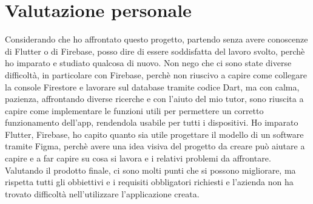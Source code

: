 \newpage

\section{Valutazione personale}
Considerando che ho affrontato questo progetto, partendo senza avere conoscenze di Flutter o di Firebase, posso dire di essere soddisfatta del lavoro svolto, perchè ho imparato e studiato qualcosa di nuovo.\newline
\newline
Non nego che ci sono state diverse difficoltà, in particolare con Firebase, perchè non riuscivo a capire come collegare la console Firestore e lavorare sul database tramite codice Dart, ma con calma, pazienza, affrontando diverse ricerche e con l'aiuto del mio tutor, sono riuscita a capire come implementare le funzioni utili per permettere un corretto funzionamento dell'app, rendendola usabile per tutti i dispositivi.\newline
\newline
Ho imparato Flutter, Firebase, ho capito quanto sia utile progettare il modello di un software tramite Figma, perchè avere una idea visiva del progetto da creare può aiutare a capire e a far capire su cosa si lavora e i relativi problemi da affrontare.\newline
\newline
Valutando il prodotto finale, ci sono molti punti che si possono migliorare, ma rispetta tutti gli obbiettivi e i requisiti obbligatori richiesti e l'azienda non ha trovato difficoltà nell'utilizzare l'applicazione creata.\newline
